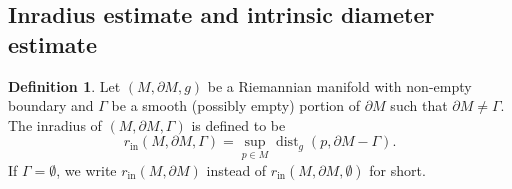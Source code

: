 \documentclass[11pt,letterpaper]{amsart}
\numberwithin{equation}{section}
\theoremstyle{definition}
\newtheorem{definition}[theorem]{Definition}
\DeclareMathOperator{\dist}{dist}
\begin{document}
\subsection{Inradius estimate and intrinsic diameter estimate}\label{Inradius estimate and intrinsic diameter estimate}
\begin{definition}\label{def: inradius}
Let $(M,\partial M,g)$ be a Riemannian manifold with non-empty boundary and $\Gamma$ be a smooth (possibly empty) portion of $\partial M$ such that $\partial M \neq \Gamma$. The inradius of $(M,\partial M,\Gamma)$ is defined to be
$$
r_{\mathrm{in}}(M,\partial M,\Gamma)=\sup_{p\in M}\dist_{g}(p,\partial M-\Gamma).
$$
If $\Gamma=\emptyset$, we write $r_{\mathrm{in}}(M,\partial M)$ instead of $r_{\mathrm{in}}(M,\partial M,\emptyset)$ for short.
\end{definition}
\end{document}
